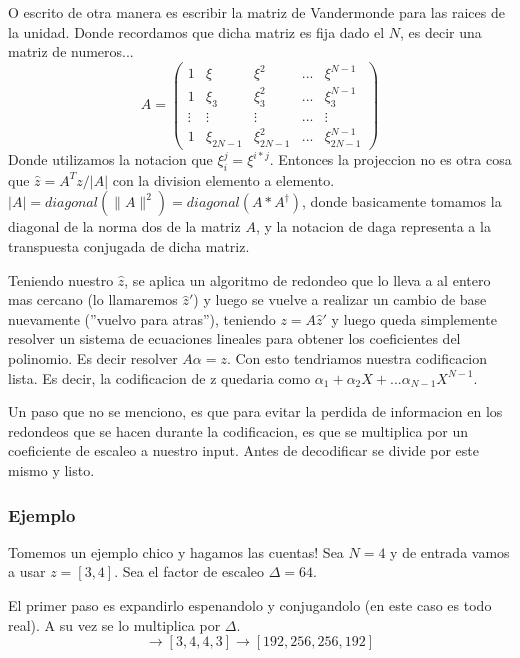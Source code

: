 \documentclass[12pt, oneside]{article}
\begin{document}
O escrito de otra manera es escribir la matriz de Vandermonde para las raices de la unidad.
Donde recordamos que dicha matriz es fija dado el $N$, es decir una matriz de numeros...
\begin{equation*}
    A=
    \begin{pmatrix}
        1 & \xi &  \xi^2 & ... & \xi^{N-1} \\
        1 & \xi_3 & \xi_3^2 & ... & \xi_3^{N-1}\\
        \vdots & \vdots & \vdots & ... & \vdots\\
        1 & \xi_{2N-1} & \xi_{2N-1}^2 & ... & \xi_{2N-1}^{N-1}
    \end{pmatrix}
    \label{eq:vandermonde}
\end{equation*}
Donde utilizamos la notacion que $\xi_i^j=\xi^{i*j}$.
Entonces la projeccion no es otra cosa que $\hat{z} = A^Tz/|A|$ con la division
elemento a elemento.
$|A|=diagonal(\parallel A\parallel^2)= diagonal(A*A^\dagger)$, donde basicamente tomamos la diagonal de
la norma dos de la matriz $A$, y la notacion de daga representa a la transpuesta conjugada de dicha matriz.


Teniendo nuestro $\hat{z}$, se aplica un algoritmo de redondeo que lo lleva a al entero mas cercano
(lo llamaremos $\hat{z}'$) y luego se vuelve a realizar un cambio de base nuevamente (''vuelvo
para atras''),
teniendo $z = A\hat{z}'$ y luego queda simplemente resolver un sistema de ecuaciones lineales para
obtener los coeficientes del polinomio.
Es decir resolver $A\alpha=z$.
Con esto tendriamos nuestra codificacion lista.
Es decir, la codificacion de z quedaria como $\alpha_1 + \alpha_2 X + ... \alpha_{N-1}X^{N-1}$.

Un paso que no se menciono, es que para evitar la perdida de informacion en los redondeos
que se hacen durante la codificacion, es que se multiplica por un coeficiente de
escaleo a nuestro input.
Antes de decodificar se divide por este mismo y listo.


\subsubsection{Ejemplo}

Tomemos un ejemplo chico y hagamos las cuentas!
Sea $N=4$ y de entrada vamos a usar $z=[3,4]$.
Sea el factor de escaleo $\Delta=64$.

El primer paso es expandirlo espenandolo y conjugandolo (en este caso es todo real).
A su vez se lo multiplica por  $\Delta$.
\begin{equation*}
    [3,4]\rightarrow [3,4,4,3] \rightarrow [192, 256, 256, 192]
\end{equation*}
\end{document}
